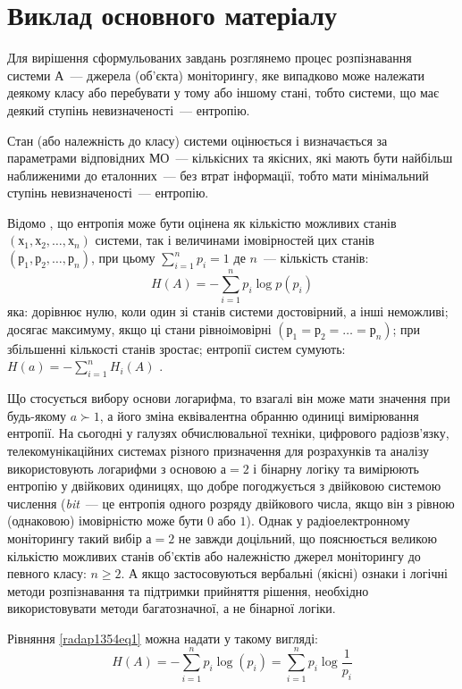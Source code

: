 \section{Виклад основного матеріалу}

Для вирішення сформульованих завдань розглянемо процес розпізнавання системи $А$~--- джерела (об’єкта) моніторингу, яке випадково може належати деякому класу або перебувати у тому або іншому стані, тобто системи, що має деякий ступінь невизначеності~--- ентропію.

Стан (або належність до класу) системи оцінюється і визначається за параметрами відповідних МО~--- кількісних та якісних, які мають бути найбільш наближеними до еталонних~--- без втрат інформації, тобто мати мінімальний ступінь невизначеності~--- ентропію.

Відомо \cite{radap1354ref4}, що ентропія може бути оцінена як кількістю можливих станів $(х_1, х_2, \ldots, х_n)$ системи, так і величинами імовірностей цих станів $(р_1, р_2, \ldots, р_n)$, при цьому $\sum_{i=1}^{n}p_i=1$  де $n$~--- кількість станів:
\begin{equation}\label{radap1354eq1}
H(A)=-\sum \limits_{i=1}^n p_i \log p(p_i)
\end{equation}
яка: дорівнює нулю, коли один зі станів системи достовірний, а інші неможливі; досягає максимуму, якщо ці стани рівноімовірні $(р_1 = р_2 = \ldots = р_n)$; при збільшенні кількості станів зростає; ентропії систем сумують: $H(a) = -\sum_{i=1}^{n}H_i(A)$ .

Що стосується вибору основи логарифма, то взагалі він може мати значення при будь-якому $a \succ 1$, а його зміна еквівалентна обранню одиниці вимірювання ентропії. На сьогодні у галузях обчислювальної техніки, цифрового радіозв’язку, телекомунікаційних системах різного призначення для розрахунків та аналізу використовують логарифми з основою $а = 2$ і бінарну логіку та вимірюють ентропію у двійкових одиницях, що добре погоджується з двійковою системою числення (\textit{bit}~--- це ентропія одного розряду двійкового числа, якщо він з рівною (однаковою) імовірністю може бути $0$ або $1$). Однак у радіоелектронному моніторингу такий вибір $а = 2$ не завжди доцільний, що пояснюється великою кількістю можливих станів об’єктів або належністю джерел моніторингу до певного класу: $n \ge 2$. А якщо застосовуються вербальні (якісні) ознаки і логічні методи розпізнавання та підтримки прийняття рішення, необхідно використовувати методи багатозначної, а не бінарної логіки.

Рівняння \eqref{radap1354eq1} можна надати у такому вигляді:
\begin{equation}\label{radap1354eq2}
H(A)=-\sum \limits_{i=1}^n p_i \log (p_i) = \sum \limits_{i=1}^n p_i \log \frac{1}{p_i}
\end{equation}

